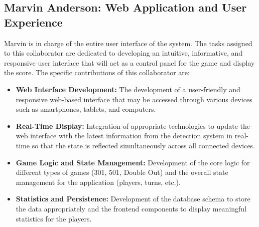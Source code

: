 \subsection{Marvin Anderson: Web Application and User Experience}
Marvin is in charge of the entire user interface of the system. The tasks assigned to this collaborator are dedicated to developing an intuitive, informative, and responsive user interface that will act as a control panel for the game and display the score. The specific contributions of this collaborator are:
\begin{itemize}
    \item \textbf{Web Interface Development:} The development of a user-friendly and responsive web-based interface that may be accessed through various devices such as smartphones, tablets, and computers.
    \item \textbf{Real-Time Display:} Integration of appropriate technologies to update the web interface with the latest information from the detection system in real-time so that the state is reflected simultaneously across all connected devices.
    \item \textbf{Game Logic and State Management:} Development of the core logic for different types of games (301, 501, Double Out) and the overall state management for the application (players, turns, etc.).
    \item \textbf{Statistics and Persistence:} Development of the database schema to store the data appropriately and the frontend components to display meaningful statistics for the players.
\end{itemize}